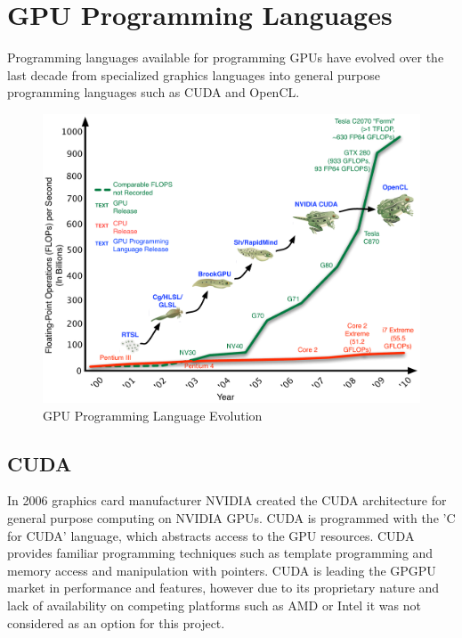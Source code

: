 \section{GPU Programming Languages}

Programming languages available for programming GPUs have evolved over the last
decade from specialized graphics languages into general purpose programming
languages such as CUDA and OpenCL.\cite{Owens2007}

\begin{figure}[!htc]
 		\centering
		\includegraphics[scale=.55]{figures/GPU_Evolution_opencl.pdf}
        \caption{ GPU Programming Language Evolution \cite{Bollig} }
        \label{fig:frogs}
\end{figure}



\subsection{CUDA}
In 2006 graphics card manufacturer NVIDIA created the CUDA architecture 
for general purpose computing on NVIDIA GPUs. CUDA is programmed with the 'C
for CUDA' language, which abstracts access to the GPU resources. CUDA provides
familiar programming techniques such as template programming and memory access
and manipulation with pointers. CUDA is leading the GPGPU market in performance
and features, however due to its proprietary nature and lack of availability on
competing platforms such as AMD or Intel it was not considered as an option for
this project.


